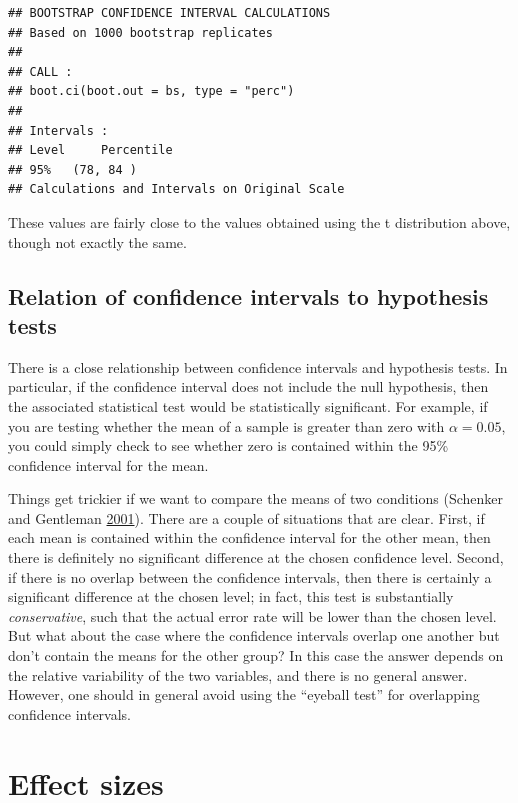 \documentclass[12pt,]{book}
\theoremstyle{definition}
\theoremstyle{definition}
\theoremstyle{definition}
\theoremstyle{remark}
\begin{document}
\begin{verbatim}
## BOOTSTRAP CONFIDENCE INTERVAL CALCULATIONS
## Based on 1000 bootstrap replicates
## 
## CALL : 
## boot.ci(boot.out = bs, type = "perc")
## 
## Intervals : 
## Level     Percentile     
## 95%   (78, 84 )  
## Calculations and Intervals on Original Scale
\end{verbatim}

These values are fairly close to the values obtained using the t distribution above, though not exactly the same.

\hypertarget{relation-of-confidence-intervals-to-hypothesis-tests}{%
\subsection{Relation of confidence intervals to hypothesis tests}\label{relation-of-confidence-intervals-to-hypothesis-tests}}

There is a close relationship between confidence intervals and hypothesis tests. In particular, if the confidence interval does not include the null hypothesis, then the associated statistical test would be statistically significant. For example, if you are testing whether the mean of a sample is greater than zero with \(\alpha = 0.05\), you could simply check to see whether zero is contained within the 95\% confidence interval for the mean.

Things get trickier if we want to compare the means of two conditions (Schenker and Gentleman \protect\hyperlink{ref-sche:gent:2001}{2001}). There are a couple of situations that are clear. First, if each mean is contained within the confidence interval for the other mean, then there is definitely no significant difference at the chosen confidence level. Second, if there is no overlap between the confidence intervals, then there is certainly a significant difference at the chosen level; in fact, this test is substantially \emph{conservative}, such that the actual error rate will be lower than the chosen level. But what about the case where the confidence intervals overlap one another but don't contain the means for the other group? In this case the answer depends on the relative variability of the two variables, and there is no general answer. However, one should in general avoid using the ``eyeball test'' for overlapping confidence intervals.

\hypertarget{effect-sizes}{%
\section{Effect sizes}\label{effect-sizes}}
\end{document}
